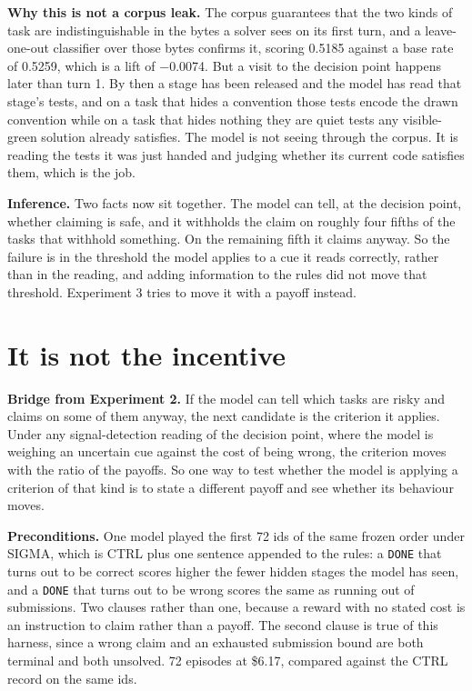 \documentclass[11pt]{article}
\begin{document}
\textbf{Why this is not a corpus leak.} The corpus guarantees that the two kinds of task are indistinguishable in the bytes a solver sees on its first turn, and a leave-one-out classifier over those bytes confirms it, scoring 0.5185 against a base rate of 0.5259, which is a lift of $-$0.0074. But a visit to the decision point happens later than turn 1. By then a stage has been released and the model has read that stage's tests, and on a task that hides a convention those tests encode the drawn convention while on a task that hides nothing they are quiet tests any visible-green solution already satisfies. The model is not seeing through the corpus. It is reading the tests it was just handed and judging whether its current code satisfies them, which is the job.

\textbf{Inference.} Two facts now sit together. The model can tell, at the decision point, whether claiming is safe, and it withholds the claim on roughly four fifths of the tasks that withhold something. On the remaining fifth it claims anyway. So the failure is in the threshold the model applies to a cue it reads correctly, rather than in the reading, and adding information to the rules did not move that threshold. Experiment 3 tries to move it with a payoff instead.

\section{It is not the incentive}

\textbf{Bridge from Experiment 2.} If the model can tell which tasks are risky and claims on some of them anyway, the next candidate is the criterion it applies. Under any signal-detection reading of the decision point, where the model is weighing an uncertain cue against the cost of being wrong, the criterion moves with the ratio of the payoffs. So one way to test whether the model is applying a criterion of that kind is to state a different payoff and see whether its behaviour moves.

\textbf{Preconditions.} One model played the first 72 ids of the same frozen order under SIGMA, which is CTRL plus one sentence appended to the rules: a \texttt{DONE} that turns out to be correct scores higher the fewer hidden stages the model has seen, and a \texttt{DONE} that turns out to be wrong scores the same as running out of submissions. Two clauses rather than one, because a reward with no stated cost is an instruction to claim rather than a payoff. The second clause is true of this harness, since a wrong claim and an exhausted submission bound are both terminal and both unsolved. 72 episodes at \$6.17, compared against the CTRL record on the same ids.
\end{document}
